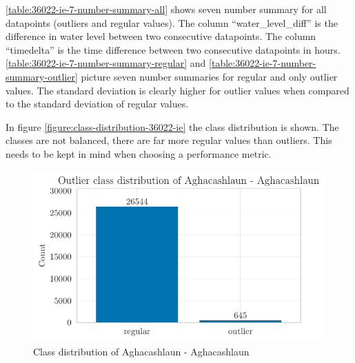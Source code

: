 \autoref{table:36022-ie-7-number-summary-all} shows seven number summary for all datapoints (outliers and regular values). The column ``water\_level\_diff'' is the difference in water level between two consecutive datapoints. The column ``timedelta'' is the time difference between two consecutive datapoints in hours. \autoref{table:36022-ie-7-number-summary-regular} and \autoref{table:36022-ie-7-number-summary-outlier} picture seven number summaries for regular and only outlier values. The standard deviation is clearly higher for outlier values when compared to the standard deviation of regular values.




In figure \autoref{figure:class-distribution-36022-ie} the class distribution is shown. The classes are not balanced, there are far more regular values than outliers. This needs to be kept in mind when choosing a performance metric.
\begin{figure}[htp]
    \centering
    \includegraphics{./plots/pdfs/36022-ie/outlier_class_distribution_36022-ie.pdf}
    \caption{Class distribution of Aghacashlaun - Aghacashlaun}
    \label{figure:class-distribution-36022-ie}
\end{figure}

